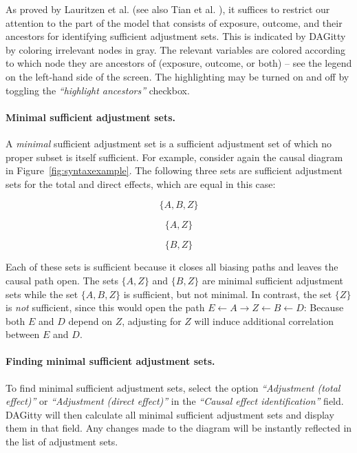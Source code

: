 \documentclass[a4paper,10pt]{article}
\newcommand{\pname}{{\sc DAG}itty\xspace}
\newcommand{\action}[1]{\emph{``#1''}}
\begin{document}
As proved by Lauritzen et al. \cite{Lauritzen1990} 
(see also Tian et al. \cite{TianPP1998}), 
it suffices to restrict our attention to the part of the model that consists of exposure, 
outcome, and their ancestors for identifying sufficient adjustment sets. This is indicated
by \pname by coloring irrelevant nodes in gray. The relevant variables are colored according 
to which node they are ancestors of (exposure, outcome, or both) -- see the legend on the 
left-hand side of the screen. The highlighting may be turned on and off by toggling the 
\action{highlight ancestors} checkbox.

\paragraph{Minimal sufficient adjustment sets.} 

A \emph{minimal} sufficient adjustment set is a sufficient 
adjustment set of which no proper subset is itself sufficient. For example, 
consider again the causal diagram in Figure~\ref{fig:syntaxexample}. 
The following three sets are sufficient adjustment sets
for the total and direct effects, which are equal in this case: 

$$ \{A,B,Z\} $$

$$ \{A,Z\} $$

$$ \{B,Z\} $$ 

Each of these sets is sufficient because it closes all biasing paths and leaves 
the causal path open. The sets $\{A,Z\}$ and $\{B,Z\}$ are minimal sufficient adjustment 
sets while the set $\{A,B,Z\}$ is sufficient, but not minimal. 
In contrast, the set $\{Z\}$ is \emph{not} sufficient, since this would 
open  
the path $E \leftarrow A \rightarrow Z \leftarrow B \leftarrow D$: 
Because both $E$ and 
$D$ depend on $Z$, adjusting for $Z$ will induce 
additional correlation between $E$ and $D$. 

\paragraph{Finding minimal sufficient adjustment sets.}

To find minimal sufficient adjustment sets, select the 
option \action{Adjustment (total effect)}
or \action{Adjustment (direct effect)} in the 
\action{Causal effect identification} field. 
\pname
will then calculate all minimal sufficient adjustment sets and display 
them in that field. Any changes made to the diagram will be instantly
reflected in the list of adjustment sets.
\end{document}
